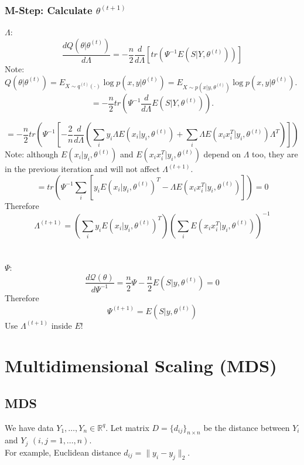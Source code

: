 \documentclass[12pt]{book}
\theoremstyle{definition}
\theoremstyle{remark}
\newcommand{\R}{\mathbb{R}}
\begin{document}
\subsection*{M-Step: Calculate \( \theta^{(t+1)} \)}

$\Lambda$: 
\[
\frac{d Q(\theta|\theta^{(t)})}{d \Lambda} = -\frac{n}{2} \frac{d}{d \Lambda}  \left[tr \left( \Psi^{-1} E (S | Y, \theta^{(t)}) \right) \right]
\]
Note: $Q(\theta|\theta^{(t)}) = E_{X\sim q^{(t)}(\cdot)}\log p(x,y|\theta^{(t)}) = E_{X\sim p(x|y,\theta^{(t)})}\log p(x,y|\theta^{(t)}) $.
\[
= -\frac{n}{2} tr \left( \Psi^{-1} \frac{d}{d \Lambda} E (S |Y, \theta^{(t)}) \right).
\]

\[
= -\frac{n}{2} tr \left( \Psi^{-1}[-\frac{2}{n}\frac{d}{d\Lambda}( \sum_{i} y_i\Lambda E (x_i | y_i, \theta^{(t)}) + \sum_{i}\Lambda E (x_i x_i^T | y_i, \theta^{(t)})\Lambda^T) ]\right)
\]
Note: although $E (x_i | y_i, \theta^{(t)})$ and $E (x_i x_i^T | y_i, \theta^{(t)})$ depend on $\Lambda$ too, they are in the previous iteration and will not affect $\Lambda^{(t+1)}$.
\[
=  tr \left( \Psi^{-1}\sum_{i}[ y_i E (x_i | y_i, \theta^{(t)})^T - \Lambda E (x_i x_i^T | y_i, \theta^{(t)}) ]\right) = 0
\]
Therefore
\[
\Lambda^{(t+1)} = \left( \sum_{i} y_i E (x_i | y_i, \theta^{(t)})^T \right) \left( \sum_{i} E (x_i x_i^T | y_i, \theta^{(t)}) \right)^{-1}
\]
\\
\\
$\Psi$:
\[
\frac{d \mathcal{Q}(\theta)}{d \Psi^{-1}} = \frac{n}{2} \Psi - \frac{n}{2} E (S | y, \theta^{(t)})=0
\]
Therefore
\[
\Psi^{(t+1)} = E (S | y, \theta^{(t)})
\]
Use $\Lambda^{(t+1)}$ inside $E$!












\chapter{Multidimensional Scaling (MDS)}
\section{MDS}

We have data $Y_1,\dots, Y_n \in \R^q$. Let matrix $D = \{d_{ij}\}_{n \times n}$ be the distance between $Y_i$ and $Y_j$ $(i,j = 1,\dots, n)$.\\
For example, Euclidean distance $d_{ij} = \|y_i-y_j\|_2$.\\
\end{document}
